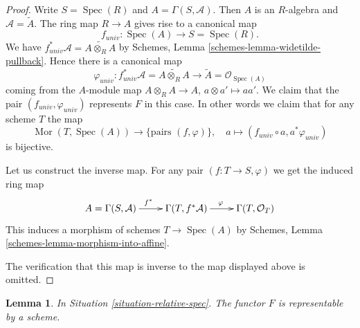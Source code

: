 \documentclass{stacks-project}
\theoremstyle{plain}
\newtheorem{lemma}[subsection]{Lemma}
\theoremstyle{definition}
\theoremstyle{remark}
\numberwithin{equation}{subsection}
\def\Spec{\mathop{\mathrm{Spec}}}
\def\Mor{\mathop{\mathrm{Mor}}\nolimits}
\begin{document}
\begin{proof}
Write $S = \Spec(R)$ and $A = \Gamma(S, \mathcal{A})$.
Then $A$ is an $R$-algebra and $\mathcal{A} = \widetilde A$.
The ring map $R \to A$ gives rise to a canonical map
$$
f_{univ} : \Spec(A)
\longrightarrow
S = \Spec(R).
$$
We have
$f_{univ}^*\mathcal{A} =  \widetilde{A \otimes_R A}$
by Schemes, Lemma \ref{schemes-lemma-widetilde-pullback}.
Hence there is a canonical map
$$
\varphi_{univ} :
f_{univ}^*\mathcal{A} = \widetilde{A \otimes_R A}
\longrightarrow
\widetilde A = \mathcal{O}_{\Spec(A)}
$$
coming from the $A$-module map $A \otimes_R A \to A$,
$a \otimes a' \mapsto aa'$. We claim that the pair
$(f_{univ}, \varphi_{univ})$ represents $F$ in this case.
In other words we claim that for any scheme $T$ the map
$$
\Mor(T, \Spec(A)) \longrightarrow \{\text{pairs } (f, \varphi)\},\quad
a \longmapsto (f_{univ} \circ a, a^*\varphi_{univ})
$$
is bijective.

\medskip\noindent
Let us construct the inverse map.
For any pair $(f : T \to S, \varphi)$ we get the induced
ring map
$$
\xymatrix{
A = \Gamma(S, \mathcal{A}) \ar[r]^{f^*} &
\Gamma(T, f^*\mathcal{A}) \ar[r]^{\varphi} &
\Gamma(T, \mathcal{O}_T)
}
$$
This induces a morphism of schemes $T \to \Spec(A)$
by Schemes, Lemma \ref{schemes-lemma-morphism-into-affine}.

\medskip\noindent
The verification that this map is inverse to the map
displayed above is omitted.
\end{proof}

\begin{lemma}
\label{lemma-spec}
In Situation \ref{situation-relative-spec}.
The functor $F$ is representable by a scheme.
\end{lemma}
\end{document}
